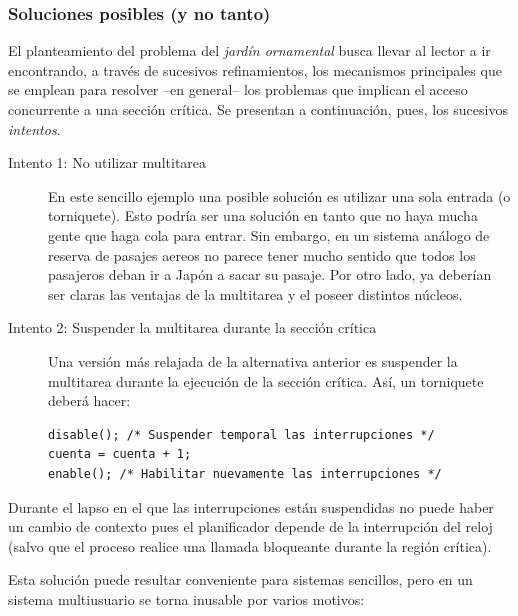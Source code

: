 \documentclass[11pt,fleqn]{book} %
\begin{document}
\subsubsection{Soluciones posibles (y no tanto)}
\label{sec-3-3-2-3}


El planteamiento del problema del \emph{jardín ornamental} busca llevar al
lector a ir encontrando, a través de sucesivos refinamientos, los
mecanismos principales que se emplean para resolver –en general– los
problemas que implican el acceso concurrente a una sección crítica. Se
presentan a continuación, pues, los sucesivos \emph{intentos}.

\begin{description}
\item[Intento 1: No utilizar multitarea] En este sencillo ejemplo una posible solución es utilizar una sola
  entrada (o torniquete). Esto podría ser una solución en tanto que no
  haya mucha gente que haga cola para entrar. Sin embargo, en un sistema
  análogo de reserva de pasajes aereos no parece tener mucho sentido que
  todos los pasajeros deban ir a Japón a sacar su pasaje. Por otro lado,
  ya deberían ser claras las ventajas de la multitarea y el poseer
  distintos núcleos.
\item[Intento 2: Suspender la multitarea durante la sección crítica] Una versión más relajada de la alternativa anterior es suspender la
  multitarea durante la ejecución de la sección crítica. Así, un
  torniquete deberá hacer:


\begin{verbatim}
disable(); /* Suspender temporal las interrupciones */
cuenta = cuenta + 1;
enable(); /* Habilitar nuevamente las interrupciones */
\end{verbatim}
\end{description}

  Durante el lapso en el que las interrupciones están suspendidas no
  puede haber un cambio de contexto pues el planificador depende de la
  interrupción del reloj (salvo que el proceso realice una
  llamada bloqueante durante la región crítica).

  Esta solución puede resultar conveniente para sistemas sencillos, pero
  en un sistema multiusuario se torna inusable por varios motivos:
\end{document}
